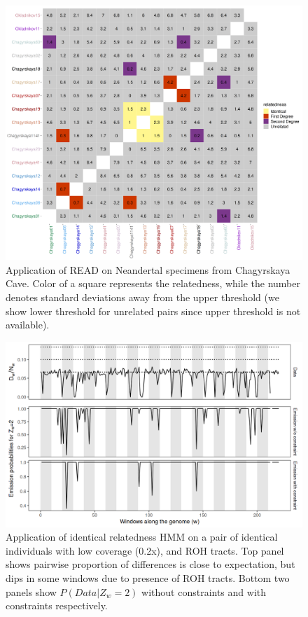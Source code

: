 \documentclass[12pt, letterpaper]{article}
\begin{document}
\begin{figure}[h!]
    \includegraphics[width=18cm]{supplementary_info/plots/fil0_read_plot.png}
    \centering
    \caption{Application of READ on Neandertal specimens from Chagyrskaya Cave. Color of a square represents the relatedness, while the number denotes standard deviations away from the upper threshold (we show lower threshold for unrelated pairs since upper threshold is not available).}
    \label{figS2:Chagyrskaya_READ}
\end{figure}


\begin{figure}[h!]
    \includegraphics[width=18cm]{supplementary_info/plots/contam0_inbred1_run57_coverage0.2_asc0_inputMode_hapProbs_fil0_pair0_15_relid_emissions_bnds.png}
    \centering
    \caption{Application of identical relatedness HMM on a pair of identical individuals with low coverage (0.2x), and ROH tracts. Top panel shows pairwise proportion of differences is close to expectation, but dips in some windows due to presence of ROH tracts. Bottom two panels show $P(Data|Z_w=2)$ without constraints and with constraints respectively.}
    \label{figS3:bnds}
\end{figure}
\end{document}

